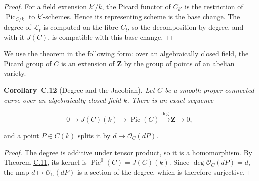 \documentclass[11pt]{article}
\newenvironment{bpstatement}[2]{\par\addvspace{0.6\baselineskip}\noindent\textbf{#1}#2\textbf{.}\enspace\ignorespaces}
  {\par\addvspace{0.4\baselineskip}}
\newenvironment{bpstatementit}[2]{\begin{bpstatement}{#1}{#2}\itshape\ignorespaces}{\end{bpstatement}}
\begin{document}
\begin{proof}[{Proof}]
For a field extension \(k'/k\), the Picard functor of \(C_{k'}\) is the restriction of \(\operatorname{Pic}_{C/k}\) to \(k'\)-schemes. Hence its representing scheme is the base change. The degree of \(\mathcal L_t\) is computed on the fibre \(C_t\), so the decomposition by degree, and with it \(J(C)\), is compatible with this base change.
\end{proof}

\label{bp156}%
We use the theorem in the following form: over an algebraically closed field, the Picard group of \(C\) is an extension of \(\mathbf Z\) by the group of points of an abelian variety.

\label{bp157}%
\begin{bpstatementit}{Corollary~C.12}{ (Degree and the Jacobian)}
Let \(C\) be a smooth proper connected curve over an algebraically closed field \(k\). There is an exact sequence

\[
0\longrightarrow J(C)(k)
\longrightarrow\operatorname{Pic}(C)
\xrightarrow{\deg}\mathbf Z\longrightarrow0,
\]

and a point \(P\in C(k)\) splits it by \(d\mapsto\mathcal O_C(dP)\).
\end{bpstatementit}

\begin{proof}[{Proof}]\label{bp158}%
The degree is additive under tensor product, so it is a homomorphism. By Theorem \hyperref[bp154]{C.11}, its kernel is \(\operatorname{Pic}^0(C)=J(C)(k)\). Since \(\deg\mathcal O_C(dP)=d\), the map \(d\mapsto\mathcal O_C(dP)\) is a section of the degree, which is therefore surjective.
\end{proof}
\end{document}
